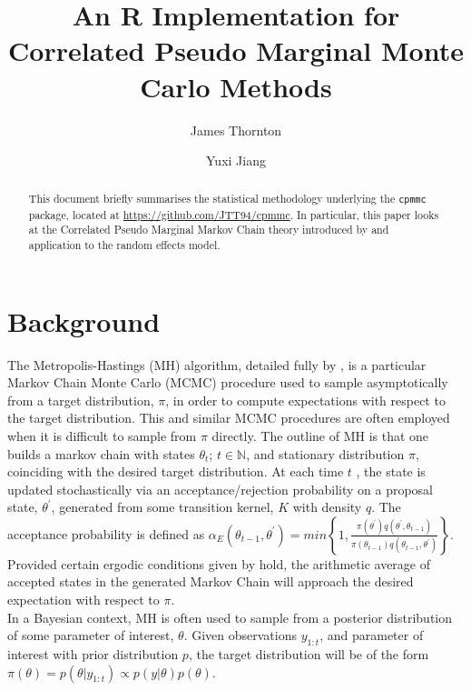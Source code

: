 \documentclass{article}
\title{An R Implementation for Correlated Pseudo Marginal Monte Carlo Methods}
\author{James Thornton \and Yuxi Jiang}
\begin{document}



\maketitle

\begin{abstract}
This document briefly summarises the statistical methodology underlying the \texttt{cpmmc} package, located at \url{https://github.com/JTT94/cpmmc}. In particular, this paper looks at the Correlated Pseudo Marginal Markov Chain theory introduced by \cite{cpmmDeligiannidis2015} and application to the random effects model.
\end{abstract}

\section{Background}

The Metropolis-Hastings (MH) algorithm, detailed fully by \cite{roberts2004}, is a particular Markov Chain Monte Carlo (MCMC) procedure used to sample asymptotically from a target distribution, $\pi$, in order to compute expectations with respect to the target distribution. This and similar MCMC procedures are often employed when it is difficult to sample from $\pi$ directly. The outline of MH is that one builds a markov chain with states $ \theta_t $; $ t \in \mathbb{N}$, and stationary distribution $\pi$, coinciding with the desired target distribution. At each time $ t $ , the state is updated stochastically via an acceptance/rejection probability on a proposal state, $\theta^\prime$, generated from some transition kernel, $K$ with density $q$. The acceptance probability is defined as  $ \alpha_E(\theta_{t-1}, \theta^\prime) = min\left\{1,  \frac{
                \pi(\theta^\prime) q(\theta^\prime, \theta_{t-1})}
                {\pi(\theta_{t-1}) q(\theta_{t-1}, \theta^\prime)}
\right\} $. Provided certain ergodic conditions given by \cite{roberts2004} hold, the arithmetic average of accepted states in the generated Markov Chain will approach the desired expectation with respect to $\pi$. \\

In a Bayesian context, MH is often used to sample from a posterior distribution of some parameter of interest, $\theta$. Given observations $y_{1:t}$, and parameter of interest with prior distribution $p$, the target distribution will be of the form $\pi (\theta) = p(\theta | y_{1:t} ) \propto p(y|\theta) p(\theta)$.\\
\end{document}
